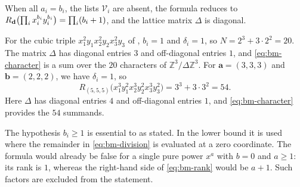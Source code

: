 When all $a_i=b_i$, the lists $\mathscr V_i$ are absent, the formula
reduces to $R_{\mathbf d}\bigl(\prod_ix_i^{b_i}y_i^{b_i}\bigr)=\prod_i(b_i+1)$,
and the lattice matrix $\Delta$ is diagonal.

\begin{example}\label{ex:bm-54}
For the cubic triple $x_1^2y_1x_2^2y_2x_3^2y_3$ of ,
$b_i=1$ and $\delta_i=1$, so $N=2^3+3\cdot2^2=20$. The matrix
$\Delta$ has diagonal entries $3$ and off-diagonal entries $1$, and
\eqref{eq:bm-character} is a sum over the $20$ characters of
$\mathbb Z^3/\Delta\mathbb Z^3$. For $\mathbf a=(3,3,3)$ and
$\mathbf b=(2,2,2)$, we have $\delta_i=1$, so
\[
R_{(5,5,5)}\bigl(x_1^3y_1^2x_2^3y_2^2x_3^3y_3^2\bigr)=3^3+3\cdot3^2=54 .
\]
Here $\Delta$ has diagonal entries $4$ and off-diagonal entries $1$,
and \eqref{eq:bm-character} provides the $54$ summands.
\end{example}

\begin{remark}\label{rem:bm-pure}
The hypothesis $b_i\ge1$ is essential to  as stated.
In the lower bound it is used where the remainder in
\eqref{eq:bm-division} is evaluated at a zero coordinate. The formula
would already be false for a single pure power $x^a$ with $b=0$ and
$a\ge1$: its rank is $1$, whereas the right-hand side of
\eqref{eq:bm-rank} would be $a+1$. Such factors are excluded from the
statement.
\end{remark}
